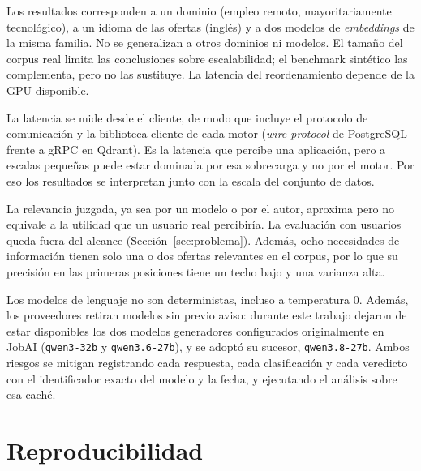 \begin{description}
\begin{itemize}
    \end{itemize}
    \item[Validez externa.] Los resultados corresponden a un dominio (empleo remoto, mayoritariamente tecnológico), a un idioma de las ofertas (inglés) y a dos modelos de \textit{embeddings} de la misma familia. No se generalizan a otros dominios ni modelos. El tamaño del corpus real limita las conclusiones sobre escalabilidad; el benchmark sintético las complementa, pero no las sustituye. La latencia del reordenamiento depende de la GPU disponible.
    \item[Medición de latencia.] La latencia se mide desde el cliente, de modo que incluye el protocolo de comunicación y la biblioteca cliente de cada motor (\textit{wire protocol} de PostgreSQL frente a gRPC en Qdrant). Es la latencia que percibe una aplicación, pero a escalas pequeñas puede estar dominada por esa sobrecarga y no por el motor. Por eso los resultados se interpretan junto con la escala del conjunto de datos.
    \item[Validez de constructo.] La relevancia juzgada, ya sea por un modelo o por el autor, aproxima pero no equivale a la utilidad que un usuario real percibiría. La evaluación con usuarios queda fuera del alcance (Sección~\ref{sec:problema}). Además, ocho necesidades de información tienen solo una o dos ofertas relevantes en el corpus, por lo que su precisión en las primeras posiciones tiene un techo bajo y una varianza alta.
    \item[Confiabilidad.] Los modelos de lenguaje no son deterministas, incluso a temperatura 0. Además, los proveedores retiran modelos sin previo aviso: durante este trabajo dejaron de estar disponibles los dos modelos generadores configurados originalmente en JobAI (\texttt{qwen3-32b} y \texttt{qwen3.6-27b}), y se adoptó su sucesor, \texttt{qwen3.8-27b}. Ambos riesgos se mitigan registrando cada respuesta, cada clasificación y cada veredicto con el identificador exacto del modelo y la fecha, y ejecutando el análisis sobre esa caché.
\end{description}

\section{Reproducibilidad}
\label{sec:met-reproducibilidad}

